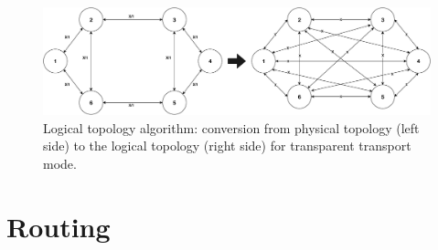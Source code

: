 \begin{figure}[H]
  \label{cisco}
  \begin{center}
    \includegraphics[width=1 \textwidth]{fig/logos/LogicalTopologyAlgorithm.pdf}
    \caption{Logical topology algorithm: conversion from physical topology (left side) to the logical topology (right side) for transparent transport mode.}
  \end{center}
  \label{logicalAlgorithm}
\end{figure}


\section{Routing}
\label{routing2}

